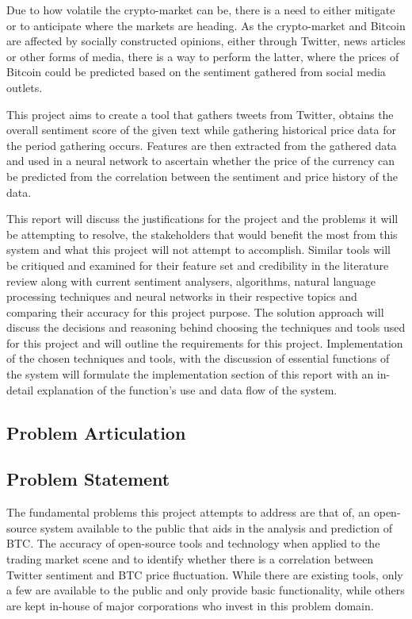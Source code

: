 \documentclass[oneside, 12pt]{article}
\begin{document}
	Due to how volatile the crypto-market can be, there is a need to either mitigate or to anticipate where the markets are heading. As the crypto-market and Bitcoin are affected by socially constructed opinions, either through Twitter, news articles or other forms of media, there is a way to perform the latter, where the prices of Bitcoin could be predicted based on the sentiment gathered from social media outlets.
	
	This project aims to create a tool that gathers tweets from Twitter, obtains the overall sentiment score of the given text while gathering historical price data for the period gathering occurs. Features are then extracted from the gathered data and used in a neural network to ascertain whether the price of the currency can be predicted from the correlation between the sentiment and price history of the data.
	
	This report will discuss the justifications for the project and the problems it will be attempting to resolve, the stakeholders that would benefit the most from this system and what this project will not attempt to accomplish. Similar tools will be critiqued and examined for their feature set and credibility in the literature review along with current sentiment analysers, algorithms, natural language processing techniques and neural networks in their respective topics and comparing their accuracy for this project purpose. 
	The solution approach will discuss the decisions and reasoning behind choosing the techniques and tools used for this project and will outline the requirements for this project.
	Implementation of the chosen techniques and tools, with the discussion of essential functions of the system will formulate the implementation section of this report with an in-detail explanation of the function's use and data flow of the system.
	
	\newpage
	
	\begin{center}
		\section{Problem Articulation}\label{problem}
	\end{center}
		
		\subsection{Problem Statement}\label{statement}
		
		The fundamental problems this project attempts to address are that of, an open-source system available to the public that aids in the analysis and prediction of BTC. The accuracy of open-source tools and technology when applied to the trading market scene and to identify whether there is a correlation between Twitter sentiment and BTC price fluctuation. While there are existing tools, only a few are available to the public and only provide basic functionality, while others are kept in-house of major corporations who invest in this problem domain.
		
\end{document}
